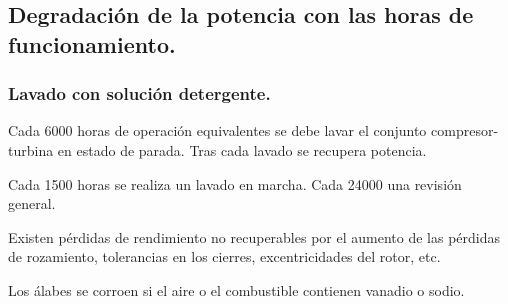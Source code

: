 		\subsection{Degradación de la potencia con las horas de funcionamiento.}
			\subsubsection{Lavado con solución detergente.}
				Cada 6000 horas de operación equivalentes se debe lavar el conjunto compresor-turbina en estado de parada. Tras cada lavado se recupera potencia.
				
				
				Cada 1500 horas se realiza un lavado en marcha. Cada 24000 una revisión general.
				
				
				Existen pérdidas de rendimiento no recuperables por el aumento de las pérdidas de rozamiento, tolerancias en los cierres, excentricidades del rotor, etc.
				
				
				Los álabes se corroen si el aire o el combustible contienen vanadio o sodio.
		
